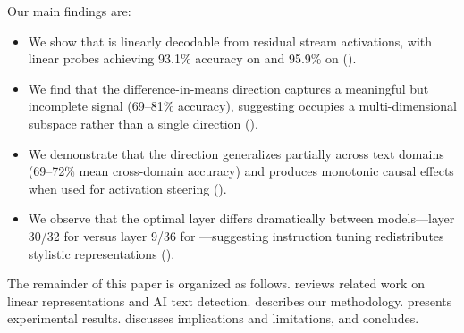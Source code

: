 Our main findings are:
\begin{itemize}[leftmargin=*,itemsep=0pt,topsep=0pt]
    \item We show that \aistyle is linearly decodable from residual stream activations, with linear probes achieving 93.1\% accuracy on \pythia and 95.9\% on \qwen ().
    \item We find that the difference-in-means direction captures a meaningful but incomplete signal (69--81\% accuracy), suggesting \aistyle occupies a multi-dimensional subspace rather than a single direction ().
    \item We demonstrate that the direction generalizes partially across text domains (69--72\% mean cross-domain accuracy) and produces monotonic causal effects when used for activation steering ().
    \item We observe that the optimal layer differs dramatically between models---layer 30/32 for \pythia versus layer 9/36 for \qwen---suggesting instruction tuning redistributes stylistic representations ().
\end{itemize}

The remainder of this paper is organized as follows.
 reviews related work on linear representations and AI text detection.
 describes our methodology.
 presents experimental results.
 discusses implications and limitations, and  concludes.
